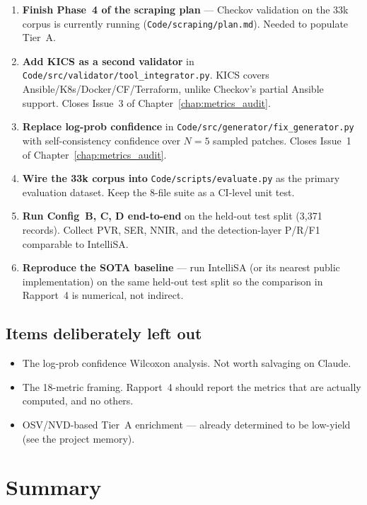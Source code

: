 \documentclass[11pt, a4paper]{report}
\begin{document}
\begin{enumerate}
  \item \textbf{Finish Phase~4 of the scraping plan} --- Checkov
        validation on the 33k corpus is currently running
        (\texttt{Code/scraping/plan.md}). Needed to populate Tier~A.
  \item \textbf{Add KICS as a second validator} in
        \texttt{Code/src/validator/tool\_integrator.py}. KICS covers
        Ansible/K8s/Docker/CF/Terraform, unlike Checkov's partial
        Ansible support. Closes Issue~3 of
        Chapter~\ref{chap:metrics_audit}.
  \item \textbf{Replace log-prob confidence} in
        \texttt{Code/src/generator/fix\_generator.py} with
        self-consistency confidence over $N=5$ sampled patches. Closes
        Issue~1 of Chapter~\ref{chap:metrics_audit}.
  \item \textbf{Wire the 33k corpus into} \texttt{Code/scripts/evaluate.py}
        as the primary evaluation dataset. Keep the 8-file suite as a
        CI-level unit test.
  \item \textbf{Run Config~B, C, D end-to-end} on the held-out test
        split (3{,}371 records). Collect PVR, SER, NNIR, and the
        detection-layer P/R/F1 comparable to IntelliSA.
  \item \textbf{Reproduce the SOTA baseline} --- run IntelliSA (or its
        nearest public implementation) on the same held-out test split
        so the comparison in Rapport~4 is numerical, not indirect.
\end{enumerate}

\section{Items deliberately left out}

\begin{itemize}
  \item The log-prob confidence Wilcoxon analysis. Not worth salvaging
        on Claude.
  \item The 18-metric framing. Rapport~4 should report the metrics that
        are actually computed, and no others.
  \item OSV/NVD-based Tier~A enrichment --- already determined to be
        low-yield (see the project memory).
\end{itemize}

\chapter{Summary}
\end{document}
